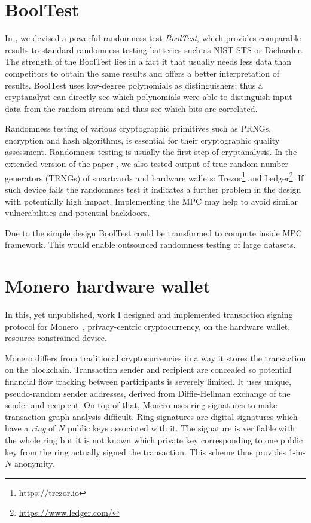 \documentclass[
  digital, %
  twoside, %
  table,   %
  lof,     %
  lot,     %
]{fithesis3}
\newcounter{ph4_show_guides}
\theoremstyle{definition}
\theoremstyle{remark}
\newcommand{\shrug}[1][]{%
	\begin{tikzpicture}[baseline,x=0.8\ht\strutbox,y=0.8\ht\strutbox,line width=0.125ex,#1]
	\def\arm{(-2.5,0.95) to (-2,0.95) (-1.9,1) to (-1.5,0) (-1.35,0) to (-0.8,0)};
	\draw \arm;
	\draw[xscale=-1] \arm;
	\def\headpart{(0.6,0) arc[start angle=-40, end angle=40,x radius=0.6,y radius=0.8]};
	\draw \headpart;
	\draw[xscale=-1] \headpart;
	\def\eye{(-0.075,0.15) .. controls (0.02,0) .. (0.075,-0.15)};
	\draw[shift={(-0.3,0.8)}] \eye;
	\draw[shift={(0,0.85)}] \eye;
	\draw (-0.1,0.2) to [out=15,in=-100] (0.4,0.95); 
	\end{tikzpicture}}
\begin{document}
\section{BoolTest}\label{sec:res:booltest} %
In \cite{booltest_secrypt2017}, we devised a powerful randomness test {\emph{BoolTest}}, which provides comparable results to standard randomness testing batteries such as NIST STS or Dieharder. The strength of the BoolTest lies in a fact it that usually needs less data than competitors to obtain the same results and offers a better interpretation of results. BoolTest uses low-degree polynomials as distinguishers; thus a cryptanalyst can directly see which polynomials were able to distinguish input data from the random stream and thus see which bits are correlated.

Randomness testing of various cryptographic primitives such as PRNGs, encryption and hash algorithms, is essential for their cryptographic quality assessment. Randomness testing is usually the first step of cryptanalysis. In the extended version of the paper \cite{booltest2}, we also tested output of true random number generators (TRNGs) of smartcards and hardware wallets: Trezor\footnote{\url{https://trezor.io}} and Ledger\footnote{\url{https://www.ledger.com/}}. If such device fails the randomness test it indicates a further problem in the design with potentially high impact. Implementing the MPC may help to avoid similar vulnerabilities and potential backdoors. 

Due to the simple design BoolTest could be transformed to compute inside MPC framework. This would enable outsourced randomness testing of large datasets.

\section{Monero hardware wallet}\label{sec:res:monero}
\label{sec:aim:monero_hw_wallet}
In this, yet unpublished, work I designed and implemented transaction signing protocol for Monero~\cite{zero_to_monero}, privacy-centric cryptocurrency, on the hardware wallet, resource constrained device. 

Monero differs from traditional cryptocurrencies in a way it stores the transaction on the blockchain. Transaction sender and recipient are concealed so potential financial flow tracking between participants is severely limited. It uses unique, pseudo-random sender addresses, derived from Diffie-Hellman exchange of the sender and recipient. On top of that, Monero uses ring-signatures to make transaction graph analysis difficult. Ring-signatures are digital signatures which have a \emph{ring} of $N$ public keys associated with it. The signature is verifiable with the whole ring but it is not known which private key corresponding to one public key from the ring actually signed the transaction. This scheme thus provides 1-in-$N$ anonymity.
\end{document}
